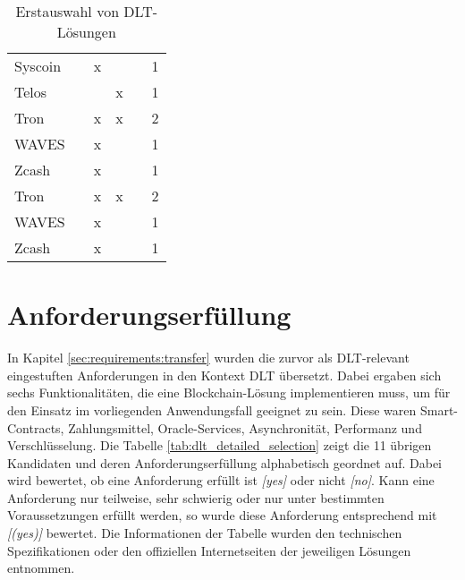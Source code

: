 \begin{table}[]
\begin{tabular}{lccccr}
Syscoin &  & x &  &  & 1 \\
Telos &  &  & x &  & 1 \\
Tron &  & x & x &  & 2 \\
WAVES &  & x &  &  & 1 \\
Zcash &  & x &  &  & 1 \\
Tron &  & x & x &  & 2 \\
WAVES &  & x &  &  & 1 \\
Zcash &  & x &  &  & 1 \\ \hline
\end{tabular}
\caption{Erstauswahl von DLT-Lösungen}
\label{tab:dlt_preselection}
\end{table}

%
%
\section{Anforderungserfüllung}
\label{sec:dlt_selection:fullfilment}
In Kapitel \ref{sec:requirements:transfer} wurden die zurvor als \ac{DLT}-relevant eingestuften Anforderungen in den Kontext \ac{DLT} übersetzt. Dabei ergaben sich sechs Funktionalitäten, die eine Blockchain-Lösung implementieren muss, um für den Einsatz im vorliegenden Anwendungsfall geeignet zu sein. Diese waren Smart-Contracts, Zahlungsmittel, Oracle-Services, Asynchronität, Performanz und Verschlüsselung. Die Tabelle \ref{tab:dlt_detailed_selection} zeigt die 11 übrigen Kandidaten und deren Anforderungserfüllung alphabetisch geordnet auf. Dabei wird bewertet, ob eine Anforderung erfüllt ist \textit{[yes]} oder nicht \textit{[no]}. Kann eine Anforderung nur teilweise, sehr schwierig oder nur unter bestimmten Voraussetzungen erfüllt werden, so wurde diese Anforderung entsprechend mit \textit{[(yes)]} bewertet. Die Informationen der Tabelle wurden den technischen Spezifikationen oder den offiziellen Internetseiten der jeweiligen Lösungen entnommen.

